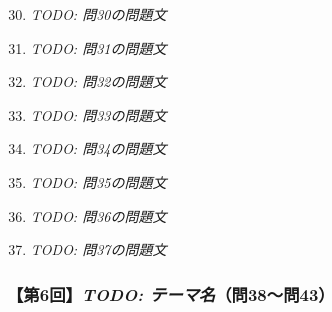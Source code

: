 \documentclass[b4paper,7pt,twocolumn,landscape]{jsarticle}
\begin{document}
\begin{enumerate}
\setcounter{enumi}{29}
\item \textit{TODO: 問30の問題文}\\

\item \textit{TODO: 問31の問題文}\\

\item \textit{TODO: 問32の問題文}\\

\item \textit{TODO: 問33の問題文}\\

\item \textit{TODO: 問34の問題文}\\

\item \textit{TODO: 問35の問題文}\\

\item \textit{TODO: 問36の問題文}\\

\item \textit{TODO: 問37の問題文}\\
\end{enumerate}

\subsubsection*{【第6回】\textit{TODO: テーマ名}（問38〜問43）}
\end{document}
